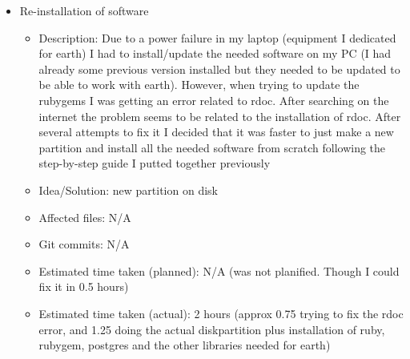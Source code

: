 \documentclass{article}
\begin{document}
\begin{itemize}
	\item Re-installation of software
	     \begin{itemize}
                \item Description: Due to a power failure in my laptop (equipment I dedicated for earth) I had to install/update  the needed software on my PC (I had already some previous version installed but they needed to be updated to be able to work with earth).  However, when trying to update the rubygems I was getting an error related to rdoc.  After searching on the internet the problem seems to be related to the installation of rdoc.  After several attempts to fix it I decided that it was faster to just make a new partition and install all the needed software from scratch following the step-by-step guide I putted together previously
                \item Idea/Solution: new partition on disk
                \item Affected files: N/A
                \item Git commits: N/A
                \item Estimated time taken (planned): N/A (was not planified.  Though I could fix it in 0.5 hours)
                \item Estimated time taken (actual): 2 hours (approx 0.75 trying to fix the rdoc error, and 1.25 doing the actual diskpartition plus installation of ruby, rubygem, postgres and the other libraries needed for earth)
            

\end{itemize}
\end{itemize}
\end{document}
